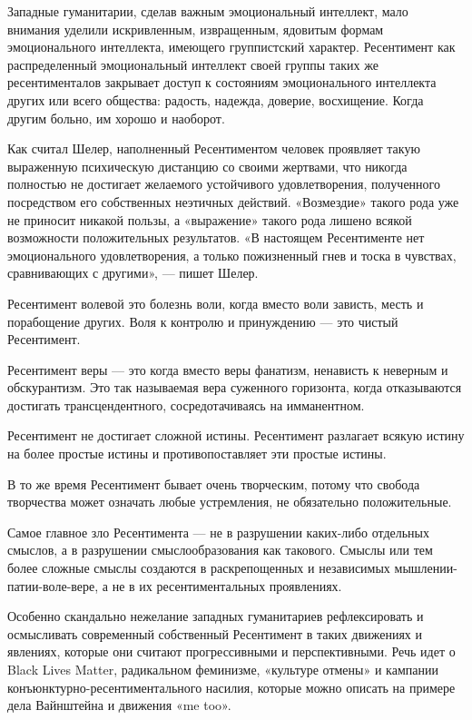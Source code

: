 Западные гуманитарии, сделав важным эмоциональный интеллект, мало внимания
уделили искривленным, извращенным, ядовитым формам эмоционального интеллекта,
имеющего группистский характер. Ресентимент как распределенный эмоциональный
интеллект своей группы таких же ресентименталов закрывает доступ к состояниям
эмоционального интеллекта других или всего общества: радость, надежда, доверие,
восхищение. Когда другим больно, им хорошо и наоборот.

Как считал Шелер, наполненный Ресентиментом человек проявляет такую
выраженную психическую дистанцию со своими жертвами,
что никогда полностью не достигает желаемого устойчивого удовлетворения,
полученного посредством его собственных неэтичных действий. «Возмездие» такого
рода уже не приносит никакой пользы, а «выражение» такого рода лишено всякой
возможности положительных результатов. «В настоящем Ресентименте нет
эмоционального удовлетворения, а только пожизненный гнев и тоска в чувствах,
сравнивающих с другими», — пишет Шелер.

Ресентимент волевой это болезнь воли, когда вместо воли зависть, месть и
порабощение других. Воля к контролю и принуждению — это чистый Ресентимент.

Ресентимент веры — это когда вместо веры фанатизм, ненависть к неверным и
обскурантизм. Это так называемая вера суженного горизонта, когда отказываются
достигать трансцендентного, сосредотачиваясь на имманентном.

Ресентимент не достигает сложной истины. Ресентимент разлагает всякую истину на
более простые истины и противопоставляет эти простые истины.

В то же время Ресентимент бывает очень творческим, потому что свобода
творчества может означать любые устремления, не обязательно положительные.

Самое главное зло Ресентимента — не в разрушении каких-либо отдельных смыслов,
а в разрушении смыслообразования как такового. Смыслы или тем более сложные
смыслы создаются в раскрепощенных и независимых мышлении-патии-воле-вере, а не
в их ресентиментальных проявлениях.

Особенно скандально нежелание западных гуманитариев рефлексировать и
осмысливать современный собственный Ресентимент в таких движениях и явлениях,
которые они считают прогрессивными и перспективными. Речь идет о Black Lives
Matter, радикальном феминизме, «культуре отмены» и кампании
конъюнктурно-ресентиментального насилия, которые можно описать на примере дела
Вайнштейна и движения «me too».

